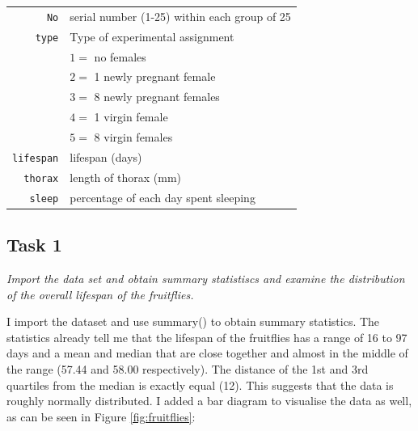 \documentclass[12pt,a4paper]{article}
\begin{document}
\begin{tabular}{r|l}
	\texttt{No} & serial number (1-25) within each group of 25\\
	\texttt{type} & Type of experimental assignment \\
	& \hspace{0.1in} $1=$ no females  \\
	& \hspace{0.1in} $2=$ 1 newly pregnant female \\
	& \hspace{0.1in} $3=$ 8 newly pregnant females\\
	& \hspace{0.1in} $4=$ 1 virgin female\\
	& \hspace{0.1in} $5=$ 8 virgin females\\
	\texttt{lifespan} & lifespan (days)\\
	\texttt{thorax} & length of thorax (mm)\\
	\texttt{sleep} & percentage of each day spent sleeping\\
\end{tabular}
\vspace{1cm}

\subsection*{Task 1}
\textit{Import the data set and obtain summary statistiscs and examine the distribution of the overall lifespan of the fruitflies.  }

I import the dataset and use summary() to obtain summary statistics. The statistics already tell me that the lifespan of the fruitflies has a range of 16 to 97 days and a mean and median that are close together and almost in the middle of the range (57.44 and 58.00 respectively). The distance of the 1st and 3rd quartiles from the median is exactly equal (12). This suggests that the data is roughly normally distributed. I added a bar diagram to visualise the data as well, as can be seen in Figure \ref{fig:fruitflies}:


\end{document}
